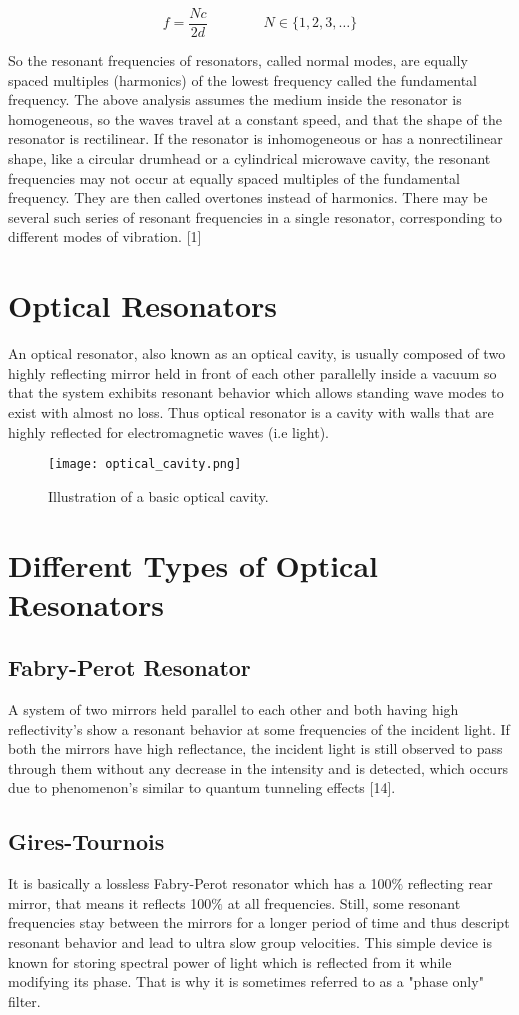 $${\displaystyle f={\frac {Nc}{2d}}\qquad \qquad N\in \{1,2,3,\dots \}}$$

So the resonant frequencies of resonators, called normal modes, are equally spaced multiples (harmonics) of the lowest frequency called the fundamental frequency. The above analysis assumes the medium inside the resonator is homogeneous, so the waves travel at a constant speed, and that the shape of the resonator is rectilinear. If the resonator is inhomogeneous or has a nonrectilinear shape, like a circular drumhead or a cylindrical microwave cavity, the resonant frequencies may not occur at equally spaced multiples of the fundamental frequency. They are then called overtones instead of harmonics. There may be several such series of resonant frequencies in a single resonator, corresponding to different modes of vibration. [1]

\section{Optical Resonators}
An optical resonator, also known as an optical cavity, is usually composed of two highly reflecting mirror held in front of each other parallelly inside a vacuum so that the system exhibits resonant behavior which allows standing wave modes to exist with almost no loss. Thus optical resonator is a cavity with walls that are highly reflected for electromagnetic waves (i.e light).

\begin{figure}[h]
\centering
\texttt{[image: optical\_cavity.png]}
\caption{Illustration of a basic optical cavity.}
\end{figure}

\section{Different Types of Optical Resonators}
\subsection{Fabry-Perot Resonator}
A system of two mirrors held parallel to each other and both having high reflectivity’s show a resonant behavior at some frequencies of the incident light. If both the mirrors have high reflectance, the incident light is still observed to pass through them without any decrease in the intensity and is detected, which occurs due to phenomenon’s similar to quantum tunneling effects [14].

\subsection{Gires-Tournois}
It is basically a lossless Fabry-Perot resonator which has a 100$\%$ reflecting rear mirror, that means it reflects 100$\%$ at all frequencies. Still, some resonant frequencies stay between the mirrors for a longer period of time and thus descript resonant behavior and lead to ultra slow group velocities. This simple device is known for storing spectral power of light which is reflected from it while modifying its phase. That is why it is sometimes referred to as a "phase only" filter.


